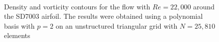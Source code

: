 \begin{figure}[htbp]
\centering
{}
\\

\caption{Density and vorticity contours for the flow with $Re = 22,000$ around the SD7003 airfoil. The results were obtained using a polynomial basis with $p=2$ on an unstructured triangular grid with $N = 25,810$ elements}
\label{sdairfoilre22k}
\end{figure}

